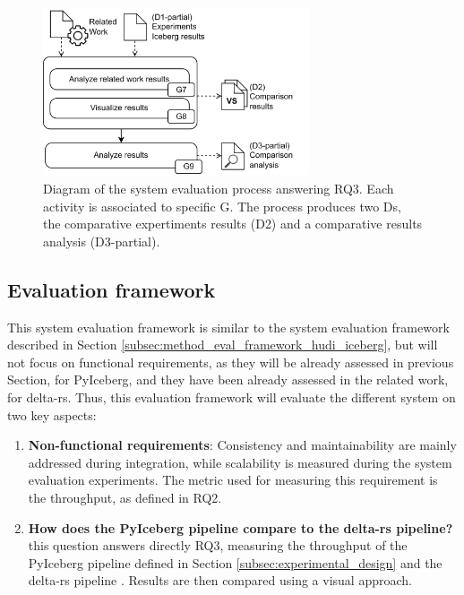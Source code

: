 \begin{figure}[!ht]
    \begin{center}
    \includegraphics[width=0.7\textwidth]{figures/3-method/method_comp.png}
    \caption[System evaluation process - PyIceberg vs. delta-rs]{Diagram of the system evaluation process answering \gls{RQ}3. Each activity is associated to specific \gls{G}. The process produces two \glspl{D}, the comparative expertiments results (\gls{D}2) and a comparative results analysis (\gls{D}3-partial).}
    \label{fig:method_comparison}
    \end{center}
\end{figure}



\subsection{Evaluation framework}
\label{subsec:method_eval_framework_iceberg_delta}

This system evaluation framework is similar to the system evaluation framework described in Section \ref{subsec:method_eval_framework_hudi_iceberg}, but will not focus on functional requirements, as they will be already assessed in previous Section, for PyIceberg, and they have been already assessed in the related work, for delta-rs. Thus, this evaluation framework will evaluate the different system on two key aspects:
\begin{enumerate}
    \item \textbf{Non-functional requirements}: Consistency and maintainability are mainly addressed during integration, while scalability is measured during the system evaluation experiments. The metric used for measuring this requirement is the throughput, as defined in \gls{RQ}2.
    \item \textbf{How does the PyIceberg pipeline compare to the delta-rs pipeline?} this question answers directly \gls{RQ}3, measuring the throughput of the PyIceberg pipeline defined in Section \ref{subsec:experimental_design} and the delta-rs pipeline \cite{manfrediReducingReadWrite2024}. Results are then compared using a visual approach.
\end{enumerate}


